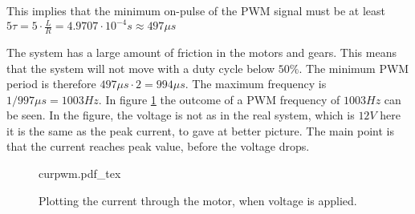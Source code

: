 \documentclass[../../../Main]{subfiles}
\begin{document}
This implies that the minimum on-pulse of the PWM signal must be at least $5\tau = 5 \cdot \frac{L}{R} = 4.9707 \cdot 10^{-4}s \approx 497\mu s$

The system has a large amount of friction in the motors and gears. This means that the system will not move with a duty cycle below $50\%$. The minimum PWM period is therefore $497\mu s \cdot 2 = 994\mu s$. The maximum frequency is $1/997\mu s = 1003 Hz$.
In figure \ref{fig:currentplot_pwm} the outcome of a PWM frequency of $1003Hz$ can be seen.
In the figure, the voltage is not as in the real system, which is $12V$ here it is the same as the peak current, to gave at better picture. The main point is that the current reaches peak value, before the voltage drops. 

\begin{figure}[H]
\centering
\def\svgwidth{\textwidth}
{curpwm.pdf_tex}
\caption{Plotting the current through the motor, when voltage is applied.}
\label{fig:currentplot_pwm}
\end{figure}
\end{document}
